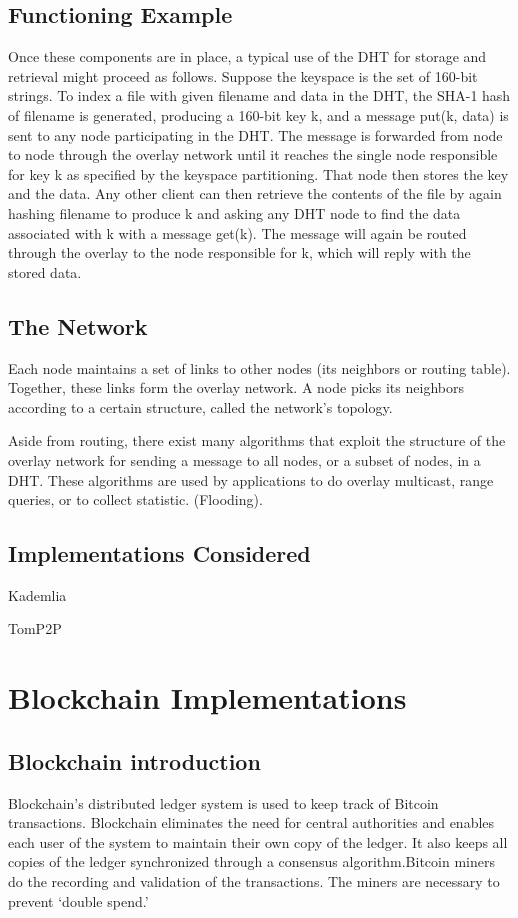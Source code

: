 \subsection{Functioning Example}
Once these components are in place, a typical use of the DHT for storage and retrieval might proceed as follows. Suppose the keyspace is the set of 160-bit strings. To index a file with given filename and data in the DHT, the SHA-1 hash of filename is generated, producing a 160-bit key k, and a message put(k, data) is sent to any node participating in the DHT. The message is forwarded from node to node through the overlay network until it reaches the single node responsible for key k as specified by the keyspace partitioning. That node then stores the key and the data. Any other client can then retrieve the contents of the file by again hashing filename to produce k and asking any DHT node to find the data associated with k with a message get(k). The message will again be routed through the overlay to the node responsible for k, which will reply with the stored data.

\subsection{The Network}
Each node maintains a set of links to other nodes (its neighbors or routing table). Together, these links form the overlay network. A node picks its neighbors according to a certain structure, called the network's topology.

Aside from routing, there exist many algorithms that exploit the structure of the overlay network for sending a message to all nodes, or a subset of nodes, in a DHT. These algorithms are used by applications to do overlay multicast, range queries, or to collect statistic. (Flooding).

\subsection*{Implementations Considered}
\begin{list}{}{}
\item Kademlia
\item TomP2P
\end{list}

\section{Blockchain Implementations}

\subsection*{Blockchain introduction}
Blockchain’s distributed ledger system is used to keep track of Bitcoin transactions. Blockchain eliminates the need for central authorities and enables each user of the system to maintain their own copy of the ledger. It also keeps all copies of the ledger synchronized through a consensus algorithm.Bitcoin miners do the recording and validation of the transactions. The miners are necessary to prevent ‘double spend.’
